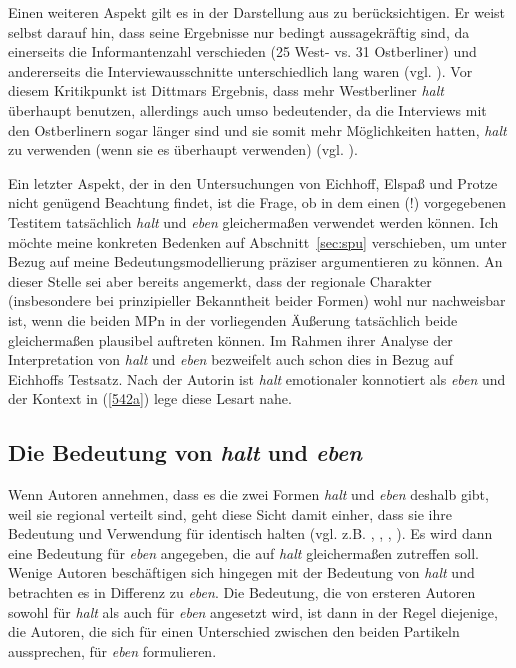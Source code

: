 Einen weiteren Aspekt gilt es in der Darstellung aus \citet{Dittmar2000} zu berücksichtigen. Er weist selbst darauf hin, dass seine Ergebnisse nur bedingt aussagekräftig sind, da einerseits die Informantenzahl verschieden (25 West- vs. 31 Ostberliner) und andererseits die Interviewausschnitte unterschiedlich lang waren (vgl. \citealt[222]{Dittmar2000}). Vor diesem Kritikpunkt ist Dittmars Ergebnis, dass mehr Westberliner \textit{halt} überhaupt benutzen, allerdings auch umso bedeutender, da die Interviews mit den Ostberlinern sogar länger sind und sie somit mehr Möglichkeiten hatten, \textit{halt} zu verwenden (wenn sie es überhaupt verwenden) (vgl. \citealt[222]{Dittmar2000}).

Ein letzter Aspekt, der in den Untersuchungen von Eichhoff, Elspaß und Protze nicht genügend Beachtung findet, ist die Frage, ob in dem einen (!) vorgegebenen Testitem tatsächlich \textit{halt} und \textit{eben} gleichermaßen verwendet werden können. Ich möchte meine konkreten Bedenken auf Abschnitt~\ref{sec:spu} verschieben, um unter Bezug auf meine Bedeutungsmodellierung präziser argumentieren zu können. An dieser Stelle sei aber bereits angemerkt, dass der regionale Charakter (insbesondere bei prinzipieller Bekanntheit beider Formen) wohl nur nachweisbar ist, wenn die beiden MPn in der vorliegenden Äußerung tatsächlich beide gleichermaßen plausibel auftreten können. Im Rahmen ihrer Analyse der Interpretation von \textit{halt} und \textit{eben} bezweifelt auch schon \citet[174]{Hentschel1986} dies in Bezug auf Eichhoffs Testsatz. Nach der Autorin ist \textit{halt} emotionaler konnotiert als \textit{eben} und der Kontext in (\ref{542a}) lege diese Lesart nahe.

\subsection{Die Bedeutung von \textit{halt} und \textit{eben}}
\label{sec:bedhe}
Wenn Autoren annehmen, dass es die zwei Formen \textit{halt} und \textit{eben} deshalb gibt, weil sie regional verteilt sind, geht diese Sicht damit einher, dass sie ihre Bedeutung und Verwendung für identisch halten (vgl. z.B. \citealt[10]{Becker1978}, \citealt[358]{Luetten1977}, \citealt[81]{Bublitz1978}, \citealt[202]{Karagjosova2004}). Es wird dann eine Bedeutung für \textit{eben} angegeben, die auf \textit{halt} gleichermaßen zutreffen soll. Wenige Autoren beschäftigen sich hingegen mit der Bedeutung von \textit{halt} und betrachten es in Differenz zu \textit{eben}. Die Bedeutung, die von ersteren Autoren sowohl für \textit{halt} als auch für \textit{eben} angesetzt wird, ist dann in der Regel diejenige, die Autoren, die sich für einen Unterschied zwischen den beiden Partikeln aussprechen, für \textit{eben} formulieren.

